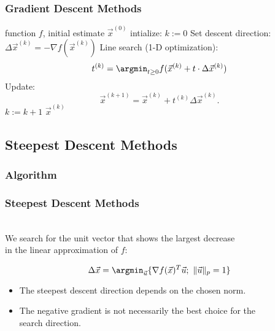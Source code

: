 \begin{frame}
  \frametitle{Gradient Descent Methods \cont}

  \begin{algorithmic}
    \STATE {} function $f$, initial estimate $\vec x^{(0)}$
    \STATE intialize: $k:=0$
    \REPEAT
      \STATE Set descent direction: $\Delta\vec x^{(k)}=- \nabla f(\vec x^{(k)}) $
      \STATE Line search (1-D optimization): $$t^{(k)}= \argmin_{t \geq 0}f(\vec x^{(k)}+t\cdot \Delta\vec x^{(k)})$$
      \STATE Update:
        \begin{displaymath}
          \vec x^{(k+1)} = \vec x^{(k)} + t^{(k)}\Delta \vec x^{(k)} .
        \end{displaymath}
      \STATE $k:= k+1$
    \STATE {} $\vec x^{(k)}$
  \end{algorithmic}
\end{frame}



\subsection{Steepest Descent Methods}

\subsubsection{Algorithm}

\begin{frame}
  \frametitle{Steepest Descent Methods}

   \\[.25cm]

  We search for the unit vector that shows the largest decrease \\
  in the linear approximation of $f$:
  
  \begin{displaymath}
    \Delta \vec x = \argmin_{\vec u} \{\nabla f(\vec x)^T \vec u ; \ \| \vec u\|_p = 1\}
  \end{displaymath}   
  \pause         
   

  \begin{itemize}
    \item The steepest descent direction depends on the chosen norm.
    \item The negative gradient is not necessarily the best choice for the \\
      search direction.
  \end{itemize}
\end{frame}


